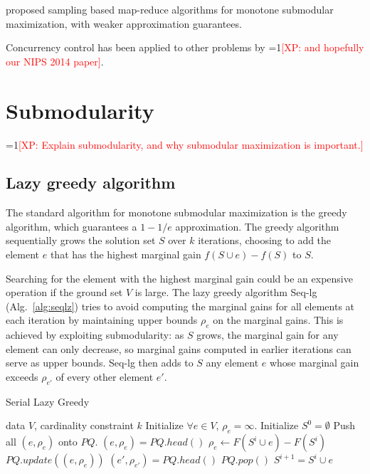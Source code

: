 \documentclass{article}
\newcommand{\Comments}{1}
\newcommand{\note}[2]{\ifnum\Comments=1\textcolor{#1}{#2}\fi}
\newcommand{\xinghao}[1]{\note{red}{[XP: #1]}}
\newcommand{\algref}[1]{Alg.~\ref{#1}}
\newcommand{\seqlz}{Seq-lg}
\begin{document}
\citet{kumar13} proposed sampling based map-reduce algorithms for monotone submodular maximization, with weaker approximation guarantees.

Concurrency control has been applied to other problems by \cite{pan2013} \xinghao{and hopefully our NIPS 2014 paper}.

\section{Submodularity}
\label{sec:submodular}
\xinghao{Explain submodularity, and why submodular maximization is important.}

\subsection{Lazy greedy algorithm}
The standard algorithm for monotone submodular maximization is the greedy algorithm, which guarantees a $1 -1/e$ approximation.
The greedy algorithm sequentially grows the solution set $S$ over $k$ iterations, choosing to add the element $e$ that has the highest marginal gain $f(S \cup e) - f(S)$ to $S$.

Searching for the element with the highest marginal gain could be an expensive operation if the ground set $V$ is large.
The lazy greedy algorithm \seqlz{} (\algref{alg:seqlz}) tries to avoid computing the marginal gains for all elements at each iteration by maintaining upper bounds $\rho_e$ on the marginal gains.
This is achieved by exploiting submodularity: as $S$ grows, the marginal gain for any element can only decrease, so marginal gains computed in earlier iterations can serve as upper bounds.
\seqlz{} then adds to $S$ any element $e$ whose marginal gain exceeds $\rho_{e'}$ of every other element $e'$.
\begin{algorithm}[tb]
  \caption{Serial Lazy Greedy}
  \label{alg:seqlz}
\begin{algorithmic}[1]
   data $V$, cardinality constraint $k$
  \STATE Initialize $\forall e \in V$, $\rho_e = \infty$.
  \STATE Initialize $S^0 = \emptyset$
  \STATE Push all $(e, \rho_e)$ onto $PQ$.
      \STATE $(e, \rho_e) = PQ.head()$
      \STATE $\rho_e \leftarrow F(S^i\cup e) - F(S^i)$
      \STATE $PQ.update((e,\rho_e))$
      \STATE $(e', \rho_{e'}) = PQ.head()$
        \STATE $PQ.pop()$
        \STATE $S^{i+1} = S^i \cup e$
      \ENDIF
    \ENDWHILE
  \ENDFOR
\end{algorithmic}
\end{algorithm}
\end{document}
